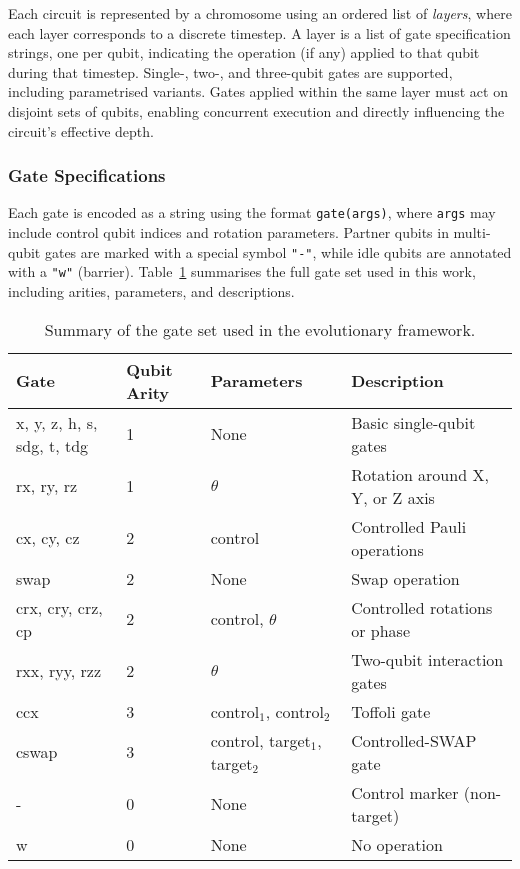 \documentclass[11pt,a4paper]{article}
\begin{document}
Each circuit is represented by a chromosome using an ordered list of \textit{layers}, where each layer corresponds to a discrete timestep. A layer is a list of gate specification strings, one per qubit, indicating the operation (if any) applied to that qubit during that timestep. Single-, two-, and three-qubit gates are supported, including parametrised variants. Gates applied within the same layer must act on disjoint sets of qubits, enabling concurrent execution and directly influencing the circuit’s effective depth.

\subsubsection*{Gate Specifications} Each gate is encoded as a string using the format \texttt{gate(args)}, where \texttt{args} may include control qubit indices and rotation parameters. Partner qubits in multi-qubit gates are marked with a special symbol \texttt{"-"}, while idle qubits are annotated with a \texttt{"w"} (barrier). Table~\ref{tab:gateset} summarises the full gate set used in this work, including arities, parameters, and descriptions.

\begin{table}[H]
    \centering
    \begin{tabular}{llll}
        \toprule
        \textbf{Gate} & \textbf{Qubit Arity} & \textbf{Parameters} & \textbf{Description} \\
        \midrule
        x, y, z, h, s, sdg, t, tdg & 1 & None & Basic single-qubit gates \\
        rx, ry, rz & 1 & $\theta$ & Rotation around X, Y, or Z axis \\
        cx, cy, cz & 2 & control & Controlled Pauli operations \\
        swap & 2 & None & Swap operation \\
        crx, cry, crz, cp & 2 & control, $\theta$ & Controlled rotations or phase \\
        rxx, ryy, rzz & 2 & $\theta$ & Two-qubit interaction gates \\
        ccx & 3 & control$_1$, control$_2$ & Toffoli gate \\
        cswap & 3 & control, target$_1$, target$_2$ & Controlled-SWAP gate \\
        - & 0 & None & Control marker (non-target) \\
        w & 0 & None & No operation \\
        \bottomrule
    \end{tabular}
    \caption{Summary of the gate set used in the evolutionary framework.}
    \label{tab:gateset}
\end{table}
\end{document}
